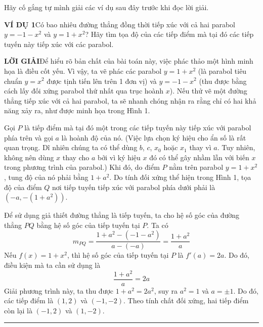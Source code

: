 \begin{minipage}[t]{380pt}
    \vspace*{18pt}
    \setlength{\parindent}{14pt}
    \setlength{\abovedisplayskip}{6pt}
    \setlength{\belowdisplayskip}{6pt}
    \setlength{\abovedisplayshortskip}{3pt}
    \setlength{\belowdisplayshortskip}{3pt}

    \noindent Hãy cố gắng tự mình giải các ví dụ sau đây trước khi đọc lời giải.

    \vspace{10pt}
    \noindent\textbf{\textsf{\color{stewartcyan}VÍ DỤ 1}}\quad Có bao nhiêu đường thẳng đồng thời tiếp xúc với cả hai parabol $y = -1 - x^2$ và $y = 1 + x^2$? Hãy tìm tọa độ của các tiếp điểm mà tại đó các tiếp tuyến này tiếp xúc với các parabol.

    \vspace{6pt}
    \noindent\textbf{\textsf{\color{stewartcyan}LỜI GIẢI}}\quad Để hiểu rõ bản chất của bài toán này, việc phác thảo một hình minh họa là điều cốt yếu. Vì vậy, ta vẽ phác các parabol $y = 1 + x^2$ (là parabol tiêu chuẩn $y = x^2$ được tịnh tiến lên trên 1 đơn vị) và $y = -1 - x^2$ (thu được bằng cách lấy đối xứng parabol thứ nhất qua trục hoành $x$). Nếu thử vẽ một đường thẳng tiếp xúc với cả hai parabol, ta sẽ nhanh chóng nhận ra rằng chỉ có hai khả năng xảy ra, như được minh họa trong Hình 1.

    Gọi $P$ là tiếp điểm mà tại đó một trong các tiếp tuyến này tiếp xúc với parabol phía trên và gọi $a$ là hoành độ của nó. (Việc lựa chọn ký hiệu cho ẩn số là rất quan trọng. Dĩ nhiên chúng ta có thể dùng $b$, $c$, $x_0$ hoặc $x_1$ thay vì $a$. Tuy nhiên, không nên dùng $x$ thay cho $a$ bởi vì ký hiệu $x$ đó có thể gây nhầm lẫn với biến $x$ trong phương trình của parabol.) Khi đó, do điểm $P$ nằm trên parabol $y = 1 + x^2$, tung độ của nó phải bằng $1 + a^2$. Do tính đối xứng thể hiện trong Hình 1, tọa độ của điểm $Q$ nơi tiếp tuyến tiếp xúc với parabol phía dưới phải là $(-a, -(1 + a^2))$.

    Để sử dụng giả thiết đường thẳng là tiếp tuyến, ta cho hệ số góc của đường thẳng $PQ$ bằng hệ số góc của tiếp tuyến tại $P$. Ta có
    \[
    m_{PQ} = \frac{1 + a^2 - (-1 - a^2)}{a - (-a)} = \frac{1 + a^2}{a}
    \]
    \noindent Nếu $f(x) = 1 + x^2$, thì hệ số góc của tiếp tuyến tại $P$ là $f'(a) = 2a$. Do đó, điều kiện mà ta cần sử dụng là
    \[
    \frac{1 + a^2}{a} = 2a
    \]
    \noindent Giải phương trình này, ta thu được $1 + a^2 = 2a^2$, suy ra $a^2 = 1$ và $a = \pm 1$. Do đó, các tiếp điểm là $(1, 2)$ và $(-1, -2)$. Theo tính chất đối xứng, hai tiếp điểm còn lại là $(-1, 2)$ và $(1, -2)$.\hfill\textcolor{stewartcyan}{\rule{1.1ex}{1.1ex}}


\end{minipage}
